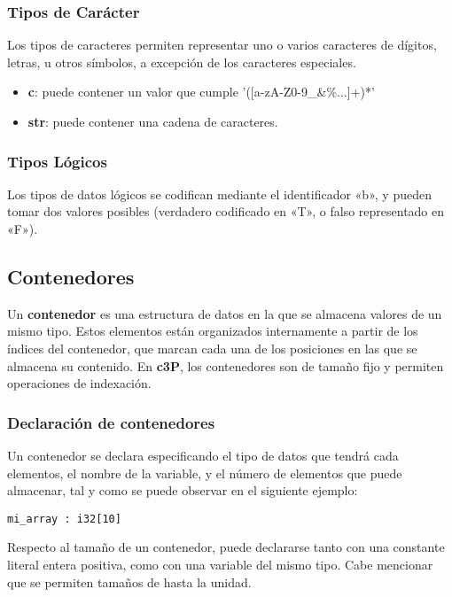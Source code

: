 \subsubsection{Tipos de Carácter}

Los tipos de caracteres permiten representar uno o varios caracteres de dígitos,
letras, u otros símbolos, a excepción de los caracteres especiales.

\begin{itemize}
    \item \textbf{c}: puede contener un valor que cumple '([a-zA-Z0-9\+\-\_\&\%...]+)*'
    \item \textbf{str}: puede contener una cadena de caracteres.
\end{itemize}

\subsubsection{Tipos Lógicos}

Los tipos de datos lógicos se codifican mediante el identificador «b», y pueden tomar dos
valores posibles (verdadero codificado en «T», o falso representado en «F»).

\subsection{Contenedores}

Un \textbf{contenedor} es una estructura de datos en la que se almacena valores de un
mismo tipo. Estos elementos están organizados internamente a partir de los índices del
contenedor, que marcan cada una de los posiciones en las que se almacena su contenido.
En \textbf{c3P}, los contenedores son de tamaño fijo y permiten operaciones de indexación.

\subsubsection{Declaración de contenedores}

Un contenedor se declara especificando el tipo de datos que tendrá cada elementos,
el nombre de la variable, y el número de elementos que puede almacenar, tal y como
se puede observar en el siguiente ejemplo:

\begin{verbatim}
mi_array : i32[10]
\end{verbatim}

Respecto al tamaño de un contenedor, puede declararse tanto con una constante literal
entera positiva, como con una variable del mismo tipo. Cabe mencionar que se permiten
tamaños de hasta la unidad.

